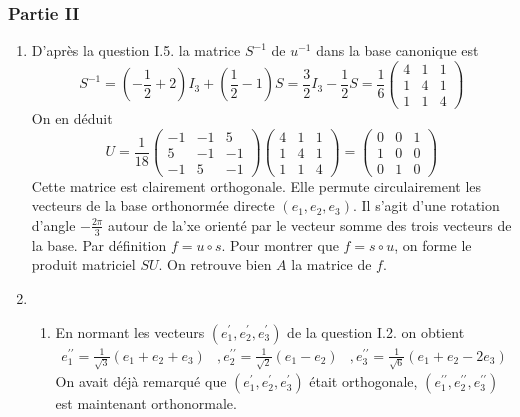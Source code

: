 \subsubsection*{Partie II}
\begin{enumerate}
 \item D'après la question I.5. la matrice $S^{-1}$ de $u^{-1}$ dans la base canonique est
\[S^{-1}=(-\frac{1}{2}+2)I_3+(\frac{1}{2}-1)S=\frac{3}{2}I_3-\frac{1}{2}S=
\frac{1}{6}\left( \begin{array}{ccc}
 4 & 1 & 1\\
 1 & 4 & 1\\
 1 & 1 & 4
       \end{array}\right) \]
On en déduit
\[U=\frac{1}{18}
\left( \begin{array}{ccc}
 -1 & -1 & 5\\
 5 & -1 & -1\\
 -1 & 5 & -1
       \end{array}\right)
\left( \begin{array}{ccc}
 4 & 1 & 1\\
 1 & 4 & 1\\
 1 & 1 & 4
       \end{array}\right)=
\left( \begin{array}{ccc}
 0 & 0 & 1\\
 1 & 0 & 0\\
 0 & 1 & 0
       \end{array}\right)\]
Cette matrice est clairement orthogonale. Elle permute circulairement les vecteurs de la base orthonormée directe $(e_1,e_2,e_3)$. Il s'agit d'une rotation d'angle $-\frac{2\pi}{3}$ autour de la'xe orienté par le vecteur somme des trois vecteurs de la base.\newline
Par définition $f=u\circ s$. Pour montrer que $f=s\circ u$, on forme le produit matriciel $SU$. On retrouve bien $A$ la matrice de $f$.
\item \begin{enumerate}
 \item En normant les vecteurs $(e^{\prime}_1,e^{\prime}_2,e^{\prime}_3)$ de la question I.2. on obtient
\begin{eqnarray*}
e^{\prime\prime}_1=\frac{1}{\sqrt{3}}(e_1+e_2+e_3)&,
e^{\prime\prime}_2=\frac{1}{\sqrt{2}}(e_1-e_2)&,
e^{\prime\prime}_3=\frac{1}{\sqrt{6}}(e_1+e_2-2e_3)
\end{eqnarray*}
On avait déjà remarqué que $(e^{\prime}_1,e^{\prime}_2,e^{\prime}_3)$ était orthogonale, $(e^{\prime\prime}_1,e^{\prime\prime}_2,e^{\prime\prime}_3)$ est maintenant orthonormale.

\end{enumerate}
\end{enumerate}
